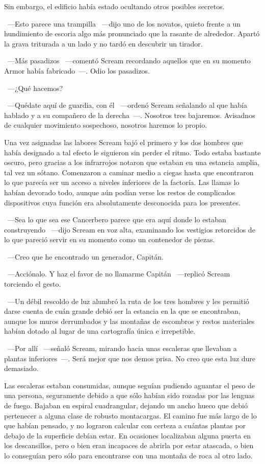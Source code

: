 Sin embargo, el edificio había estado ocultando otros posibles secretos.

~---Esto parece una trampilla ~---dijo uno de los novatos, quieto frente a un hundimiento de escoria algo más pronunciado que la rasante de alrededor. Apartó la grava triturada a un lado y no tardó en descubrir un tirador.

~---Más pasadizos ~---comentó Scream recordando aquellos que en su momento Armor había fabricado~---. Odio los pasadizos.

~---¿Qué hacemos?

~---Quédate aquí de guardia, con él ~---ordenó Scream señalando al que había hablado y a su compañero de la derecha~---. Nosotros tres bajaremos. Avisadnos de cualquier movimiento sospechoso, nosotros haremos lo propio.

Una vez asignadas las labores Scream bajó el primero y los dos hombres que había designado a tal efecto le siguieron sin perder el ritmo. Todo estaba bastante oscuro, pero gracias a los infrarrojos notaron que estaban en una estancia amplia, tal vez un sótano. Comenzaron a caminar medio a ciegas hasta que encontraron lo que parecía ser un acceso a niveles inferiores de la factoría. Las llamas lo habían devorado todo, aunque aún podían verse los restos de complicados dispositivos cuya función era absolutamente desconocida para los presentes.

~---Sea lo que sea ese Cancerbero parece que era aquí donde lo estaban construyendo ~---dijo Scream en voz alta, examinando los vestigios retorcidos de lo que pareció servir en su momento como un contenedor de piezas.

~---Creo que he encontrado un generador, Capitán.

~---Acciónalo. Y haz el favor de no llamarme Capitán ~---replicó Scream torciendo el gesto.

~---Un débil rescoldo de luz alumbró la ruta de los tres hombres y les permitió darse cuenta de cuán grande debió ser la estancia en la que se encontraban, aunque los muros derrumbados y las montañas de escombros y restos materiales habían dotado al lugar de una cartografía única e irrepetible.

~---Por allí ~---señaló Scream, mirando hacia unas escaleras que llevaban a plantas inferiores~---. Será mejor que nos demos prisa. No creo que esta luz dure demasiado.

Las escaleras estaban consumidas, aunque seguían pudiendo aguantar el peso de una persona, seguramente debido a que sólo habían sido rozadas por las lenguas de fuego. Bajaban en espiral cuadrangular, dejando un ancho hueco que debió pertenecer a alguna clase de robusto montacargas. El camino fue más largo de lo que habían pensado, y no lograron calcular con certeza a cuántas plantas por debajo de la superficie debían estar. En ocasiones localizaban alguna puerta en los descansillos, pero o bien eran incapaces de abrirla por estar atascada, o bien lo conseguían pero sólo para encontrarse con una montaña de roca al otro lado.

